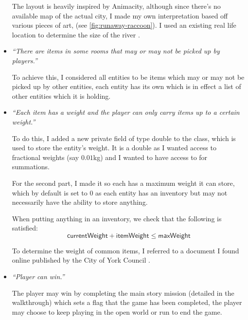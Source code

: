 \documentclass{article}
\begin{document}
\begin{multicols}{2}
\begin{itemize}[leftmargin=*]
                    The layout is heavily inspired by Animacity, although since there's no available map of the actual city, I made my own interpretation based off various pieces of art, (see \autoref{fig:runaway-raccoon}). I used an existing real life location to determine the size of the river \cite{river-map}.

                \item \textit{``There are items in some rooms that may or may not be picked up by players.''}
                
                    To achieve this, I considered all entities to be items which may or may not be picked up by other entities, each entity has its own  which is in effect a list of other entities which it is holding.
                
                \item \textit{``Each item has a weight and the player can only carry items up to a certain weight.''}
                
                    To do this, I added a new private field  of type double to the  class, which is used to store the entity's weight. It is a double as I wanted access to fractional weights (say $0.01$kg) and I wanted to have access to  for summations.

                    For the second part, I made it so each  has a maximum weight it can store, which by default is set to $0$ as each entity has an inventory but may not necessarily have the ability to store anything.

                    When putting anything in an inventory, we check that the following is satisfied:
                    $$
                        \textsf{currentWeight} + \textsf{itemWeight} \le \textsf{maxWeight}
                    $$

                    To determine the weight of common items, I referred to a document I found online published by the City of York Council \cite{common-weights}.
                
                \item \textit{``Player can win.''}
                
                    The player may win by completing the main story mission (detailed in the walkthrough) which sets a flag that the game has been completed, the player may choose to keep playing in the open world or run  to end the game.


\end{itemize}
\end{multicols}
\end{document}
